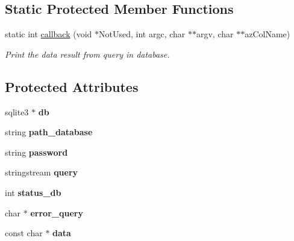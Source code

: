 \subsection*{Static Protected Member Functions}
\begin{DoxyCompactItemize}
\item 
static int \hyperlink{classSQLite_a2cdec2824226fb74b9c5f53fb2eb9c52}{callback} (void $\ast$Not\+Used, int argc, char $\ast$$\ast$argv, char $\ast$$\ast$az\+Col\+Name)
\begin{DoxyCompactList}\small\item\em Print the data result from query in database. \end{DoxyCompactList}\end{DoxyCompactItemize}
\subsection*{Protected Attributes}
\begin{DoxyCompactItemize}
\item 
sqlite3 $\ast$ {\bfseries db}\hypertarget{classSQLite_a1d24b48aa333500d31dd1741c474ee77}{}\label{classSQLite_a1d24b48aa333500d31dd1741c474ee77}

\item 
string {\bfseries path\+\_\+database}\hypertarget{classSQLite_a35c90bc05faa587c66031661a365db20}{}\label{classSQLite_a35c90bc05faa587c66031661a365db20}

\item 
string {\bfseries password}\hypertarget{classSQLite_a5db7ea6ca4da520fb5125631b081acb9}{}\label{classSQLite_a5db7ea6ca4da520fb5125631b081acb9}

\item 
stringstream {\bfseries query}\hypertarget{classSQLite_a524b7fb749c55eae9076981de81f6576}{}\label{classSQLite_a524b7fb749c55eae9076981de81f6576}

\item 
int {\bfseries status\+\_\+db}\hypertarget{classSQLite_ab54d46b70b16ac3d91631c926d633d42}{}\label{classSQLite_ab54d46b70b16ac3d91631c926d633d42}

\item 
char $\ast$ {\bfseries error\+\_\+query}\hypertarget{classSQLite_a641bc6c63769eee5ab03dfd0cd26f0bc}{}\label{classSQLite_a641bc6c63769eee5ab03dfd0cd26f0bc}

\item 
const char $\ast$ {\bfseries data}\hypertarget{classSQLite_a7c608c690c08fce28810d549ab488074}{}\label{classSQLite_a7c608c690c08fce28810d549ab488074}

\end{DoxyCompactItemize}


